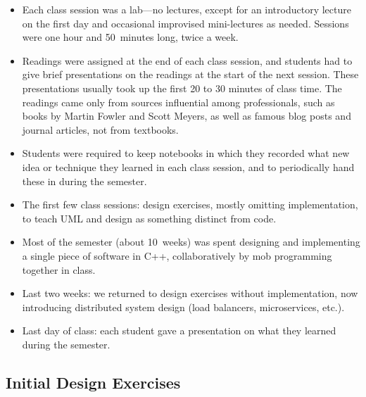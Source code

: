 \documentclass{article}
\begin{document}
\begin{itemize}
\item Each class session was a lab---no lectures, except for an introductory
lecture on the first day and occasional improvised mini-lectures as needed.
Sessions were one hour and 50~minutes long, twice a week.

\item Readings were assigned at the end of each class session, and students
had to give brief presentations on the readings at the start of the next
session. These presentations usually took up the first 20 to 30 minutes of
class time. The readings came only from sources influential among
professionals, such as books by Martin Fowler and Scott Meyers, as well as
famous blog posts and journal articles, not from textbooks.

\item Students were required to keep notebooks in which they recorded what new
idea or technique they learned in each class session, and to periodically hand
these in during the semester.

\item The first few class sessions: design exercises, mostly omitting
implementation, to teach UML and design as something distinct from code.

\item Most of the semester (about 10~weeks) was spent designing and
implementing a single piece of software in C++, collaboratively by mob
programming together in class.

\item Last two weeks: we returned to design exercises without implementation,
now introducing distributed system design (load balancers, microservices,
etc.).


\item Last day of class: each student gave a presentation on what they learned
during the semester.
\end{itemize}

\subsection{Initial Design Exercises}
\end{document}
